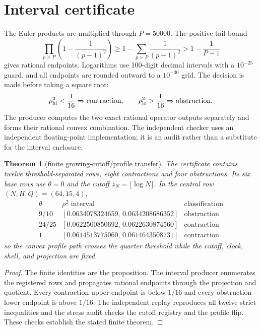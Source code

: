\documentclass[11pt]{article}
\newtheorem{theorem}{Theorem}
\begin{document}
\section{Interval certificate}
The Euler products are multiplied through $P=50000$. The positive tail bound
\[
 \prod_{p>P}\left(1-\frac1{(p-1)^2}\right)
 \geq1-\sum_{p>P}\frac1{(p-1)^2}>1-\frac1{P-1}
\]
gives rational endpoints. Logarithms use 100-digit decimal intervals with a
$10^{-25}$ guard, and all endpoints are rounded outward to a $10^{-30}$ grid.
The decision is made before taking a square root:
\[
 \rho^2_{\rm hi}<\frac1{16}\Rightarrow\text{contraction},\qquad
 \rho^2_{\rm lo}>\frac1{16}\Rightarrow\text{obstruction}.
\]
The producer computes the two exact rational operator outputs separately and
forms their rational convex combination. The independent checker uses an
independent floating-point implementation; it is an audit rather than a
substitute for the interval enclosure.
\begin{theorem}[finite growing-cutoff/profile transfer]
The certificate contains twelve threshold-separated rows, eight contractions
and four obstructions. Its six base rows use $\theta=0$ and the cutoff
$z_N=\lfloor\log N\rfloor$. In the central row $(N,H,Q)=(64,15,4)$,
\[
 \begin{array}{c|c|c}
 \theta&\rho^2\text{ interval}&\text{classification}\\ \hline
 9/10&[0.0634078324659,\,0.0634208686352]&\text{obstruction}\\
 24/25&[0.0622500850692,\,0.0622630874560]&\text{contraction}\\
 1&[0.0614513775060,\,0.0614643508731]&\text{contraction}
 \end{array}
\]
so the convex profile path crosses the quarter threshold while the cutoff,
clock, shell, and projection are fixed.
\end{theorem}
\begin{proof}
The finite identities are the proposition. The interval producer enumerates the
registered rows and propagates rational endpoints through the projection and
quotient. Every contraction upper endpoint is below $1/16$ and every obstruction
lower endpoint is above $1/16$. The independent replay reproduces all twelve
strict inequalities and the stress audit checks the cutoff registry and the
profile flip. These checks establish the stated finite theorem.
\end{proof}
\end{document}
